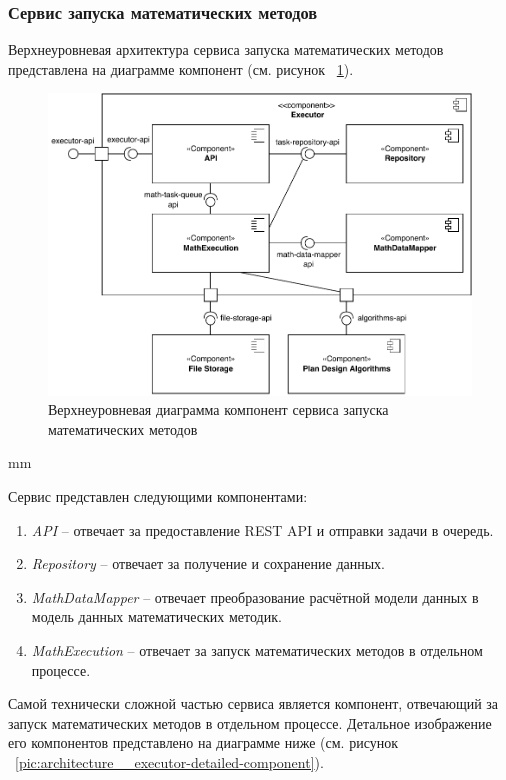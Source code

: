 \subsubsection{{Сервис запуска математических методов}}

Верхнеуровневая архитектура сервиса запуска математических методов представлена на диаграмме компонент
(см. рисунок \ \ref{pic:architecture__executor-component}).

\begin{figure}[H]
	\includegraphics[width=\textwidth]{architecture/pictures/executor/component_common}
	\caption{Верхнеуровневая диаграмма компонент сервиса запуска математических методов}
	\label{pic:architecture__executor-component}
\end{figure}
 mm

Сервис представлен следующими компонентами:
\begin{enumerate}
	\item {
		\textit{API} -- отвечает за предоставление REST API и отправки задачи в очередь.
	}
	\item {
		\textit{Repository} -- отвечает за получение и сохранение данных.
	}
	\item {
		\textit{MathDataMapper} -- отвечает преобразование расчётной модели данных в модель данных математических методик.
	}
	\item {
		\textit{MathExecution} -- отвечает за запуск математических методов в отдельном процессе.
	}
\end{enumerate}

Самой технически сложной частью сервиса является компонент, отвечающий за запуск математических методов
в отдельном процессе. Детальное изображение его компонентов представлено
на диаграмме ниже (см. рисунок \ \ref{pic:architecture__executor-detailed-component}).


